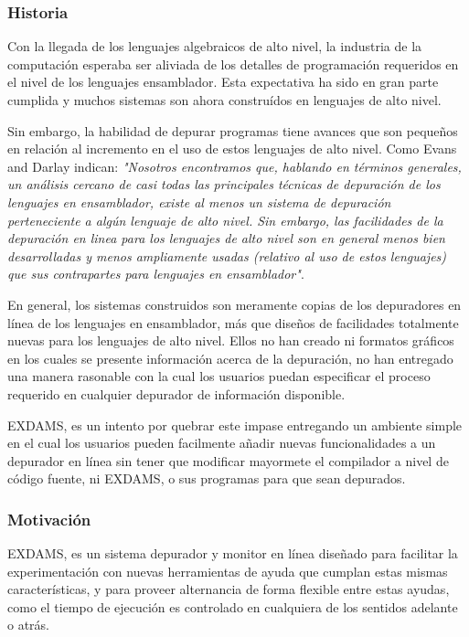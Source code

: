 \documentclass[12pt,legalpaper]{report}
\begin{document}
			\subsubsection{Historia}

Con la llegada de los lenguajes algebraicos de alto nivel, la industria de la computación esperaba ser aliviada de los detalles de programación requeridos en el nivel de los lenguajes ensamblador.  Esta expectativa ha sido en gran parte cumplida y muchos sistemas son ahora construídos en lenguajes de alto nivel.

Sin embargo, la habilidad de depurar programas tiene avances que son pequeños en relación al incremento en el uso de estos lenguajes de alto nivel.  Como Evans and Darlay \cite{EvansDarlay} indican:
\textit{"Nosotros encontramos que, hablando en términos generales, un análisis cercano de casi todas las principales técnicas de depuración de los lenguajes en ensamblador, existe al menos un sistema de depuración perteneciente a algún lenguaje de alto nivel.  Sin embargo, las facilidades de la depuración en linea para los lenguajes de alto nivel son en general menos bien desarrolladas y menos ampliamente usadas (relativo al uso de estos lenguajes) que sus contrapartes para lenguajes en ensamblador"}.

En general, los sistemas construidos son meramente copias de los depuradores en línea de los lenguajes en ensamblador, más que diseños de facilidades totalmente nuevas para los lenguajes de alto nivel.  Ellos no han creado ni formatos gráficos en los cuales se presente información acerca de la depuración, no han entregado una manera rasonable con la cual los usuarios puedan especificar el proceso requerido en cualquier depurador de información disponible.

EXDAMS, es un intento por quebrar este impase entregando un ambiente simple en el cual los usuarios pueden facilmente añadir nuevas funcionalidades a un depurador en línea sin tener que modificar mayormete el compilador a nivel de código fuente, ni EXDAMS, o sus programas para que sean depurados.


			\subsubsection{Motivación}

EXDAMS, es un sistema depurador y monitor en línea diseñado para facilitar la experimentación con nuevas herramientas de ayuda que cumplan estas mismas características, y para proveer alternancia de forma flexible entre estas ayudas, como el tiempo de ejecución es controlado en cualquiera de los sentidos adelante o atrás.
\end{document}
